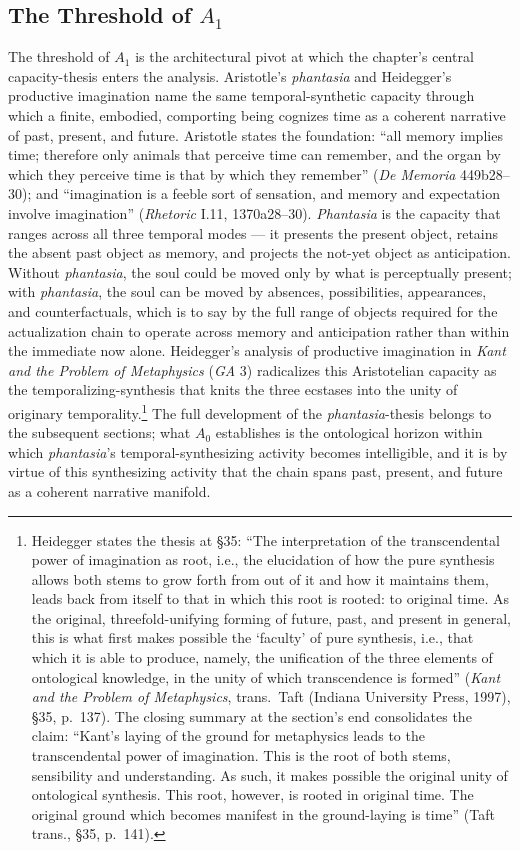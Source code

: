 \documentclass{article}
\begin{document}
\subsection{The Threshold of $A_1$}

The threshold of $A_1$ is the architectural pivot at which the chapter's central capacity-thesis enters the analysis. Aristotle's \textit{phantasia} and Heidegger's productive imagination name the same temporal-synthetic capacity through which a finite, embodied, comporting being cognizes time as a coherent narrative of past, present, and future. Aristotle states the foundation: ``all memory implies time; therefore only animals that perceive time can remember, and the organ by which they perceive time is that by which they remember'' (\textit{De Memoria} 449b28--30); and ``imagination is a feeble sort of sensation, and memory and expectation involve imagination'' (\textit{Rhetoric} I.11, 1370a28--30). \textit{Phantasia} is the capacity that ranges across all three temporal modes --- it presents the present object, retains the absent past object as memory, and projects the not-yet object as anticipation. Without \textit{phantasia}, the soul could be moved only by what is perceptually present; with \textit{phantasia}, the soul can be moved by absences, possibilities, appearances, and counterfactuals, which is to say by the full range of objects required for the actualization chain to operate across memory and anticipation rather than within the immediate now alone. Heidegger's analysis of productive imagination in \textit{Kant and the Problem of Metaphysics} (\textit{GA} 3) radicalizes this Aristotelian capacity as the temporalizing-synthesis that knits the three ecstases into the unity of originary temporality.\footnote{Heidegger states the thesis at \S 35: ``The interpretation of the transcendental power of imagination as root, i.e., the elucidation of how the pure synthesis allows both stems to grow forth from out of it and how it maintains them, leads back from itself to that in which this root is rooted: to original time. As the original, threefold-unifying forming of future, past, and present in general, this is what first makes possible the `faculty' of pure synthesis, i.e., that which it is able to produce, namely, the unification of the three elements of ontological knowledge, in the unity of which transcendence is formed'' (\textit{Kant and the Problem of Metaphysics}, trans.~Taft (Indiana University Press, 1997), \S 35, p.~137). The closing summary at the section's end consolidates the claim: ``Kant's laying of the ground for metaphysics leads to the transcendental power of imagination. This is the root of both stems, sensibility and understanding. As such, it makes possible the original unity of ontological synthesis. This root, however, is rooted in original time. The original ground which becomes manifest in the ground-laying is time'' (Taft trans., \S 35, p.~141).} The full development of the \textit{phantasia}-thesis belongs to the subsequent sections; what $A_0$ establishes is the ontological horizon within which \textit{phantasia}'s temporal-synthesizing activity becomes intelligible, and it is by virtue of this synthesizing activity that the chain spans past, present, and future as a coherent narrative manifold.
\end{document}
